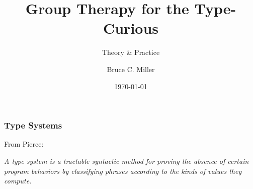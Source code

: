 \documentclass{beamer}
\title{Group Therapy for the Type-Curious}
\subtitle{Theory \& Practice}
\author{Bruce C. Miller}
\institute{bm3719@gmail.com}
\date{\today}
\begin{document}
\begin{frame}
\titlepage
\end{frame}

\begin{frame}
\frametitle{Type Systems}

From Pierce:

\vspace{20pt}
\textit{A type system is a tractable syntactic method for proving the absence of
  certain program behaviors by classifying phrases according to the kinds of
  values they compute.}

\end{frame}
\end{document}
